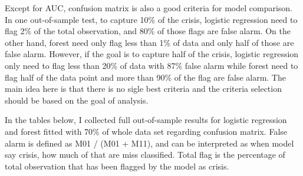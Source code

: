 \documentclass{article}
\begin{document}
Except for AUC, confusion matrix is also a good criteria for model
comparison. In one out-of-sample test, to capture 10\% of the crisis,
logistic regression need to flag 2\% of the total observation, and 80\%
of those flags are false alarm. On the other hand, forest need only flag
less than 1\% of data and only half of those are false alarm. However,
if the goal is to capture half of the crisis, logistic regression only
need to flag less than 20\% of data with 87\% false alarm while forest
need to flag half of the data point and more than 90\% of the flag are
false alarm. The main idea here is that there is no sigle best criteria
and the criteria selection should be based on the goal of analysis.

In the tables below, I collected full out-of-sample results for logistic
regression and forest fitted with 70\% of whole data set regarding confusion matrix. False alarm is defined as
M01 / (M01 + M11), and can be interpreted as when model say crisis, how much of that are
miss classified. Total flag is the percentage of total observation that has been flagged by the model as crisis.
\end{document}
